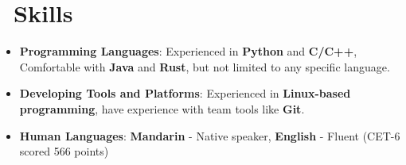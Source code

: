 \documentclass{resume}
\begin{document}




\section{\faCogs\ Skills}
\begin{itemize}[parsep=0.5ex]
  \item \textbf{Programming Languages}: Experienced in \textbf{Python} and \textbf{C/C++}, Comfortable with \textbf{Java} and \textbf{Rust}, but not limited to any specific language.
  \item \textbf{Developing Tools and Platforms}: Experienced in \textbf{Linux-based programming}, have experience with team tools like \textbf{Git}.
  \item \textbf{Human Languages}: \textbf{Mandarin} - Native speaker, \textbf{English} - Fluent (CET-6 scored 566 points)
\end{itemize}






%
%
\end{document}
